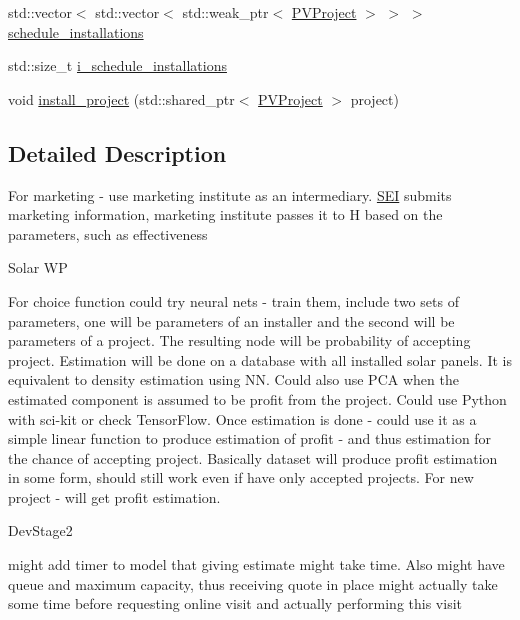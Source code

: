 \begin{DoxyCompactItemize}
\item 
std\+::vector$<$ std\+::vector$<$ std\+::weak\+\_\+ptr$<$ \hyperlink{classsolar__core_1_1_p_v_project}{P\+V\+Project} $>$ $>$ $>$ \hyperlink{classsolar__core_1_1_s_e_i_aacda4fae2c17d58672b60eba9c8cdc63}{schedule\+\_\+installations}
\item 
std\+::size\+\_\+t \hyperlink{classsolar__core_1_1_s_e_i_ad906dcd5b638e405a7daf14539096377}{i\+\_\+schedule\+\_\+installations}
\item 
void \hyperlink{classsolar__core_1_1_s_e_i_a1ab2217b83050e4320afa11c4d838fde}{install\+\_\+project} (std\+::shared\+\_\+ptr$<$ \hyperlink{classsolar__core_1_1_p_v_project}{P\+V\+Project} $>$ project)
\end{DoxyCompactItemize}


\subsection{Detailed Description}
For marketing -\/ use marketing institute as an intermediary. \hyperlink{classsolar__core_1_1_s_e_i}{S\+E\+I} submits marketing information, marketing institute passes it to H based on the parameters, such as effectiveness

\begin{DoxyRefDesc}{Solar W\+P}
\item[\hyperlink{wp__wp000004}{Solar W\+P}]For choice function could try neural nets -\/ train them, include two sets of parameters, one will be parameters of an installer and the second will be parameters of a project. The resulting node will be probability of accepting project. Estimation will be done on a database with all installed solar panels. It is equivalent to density estimation using N\+N. Could also use P\+C\+A when the estimated component is assumed to be profit from the project. Could use Python with sci-\/kit or check Tensor\+Flow. Once estimation is done -\/ could use it as a simple linear function to produce estimation of profit -\/ and thus estimation for the chance of accepting project. Basically dataset will produce profit estimation in some form, should still work even if have only accepted projects. For new project -\/ will get profit estimation.\end{DoxyRefDesc}


\begin{DoxyRefDesc}{Dev\+Stage2}
\item[\hyperlink{_dev_stage2__DevStage2000016}{Dev\+Stage2}]might add timer to model that giving estimate might take time. Also might have queue and maximum capacity, thus receiving quote in place might actually take some time before requesting online visit and actually performing this visit\end{DoxyRefDesc}


